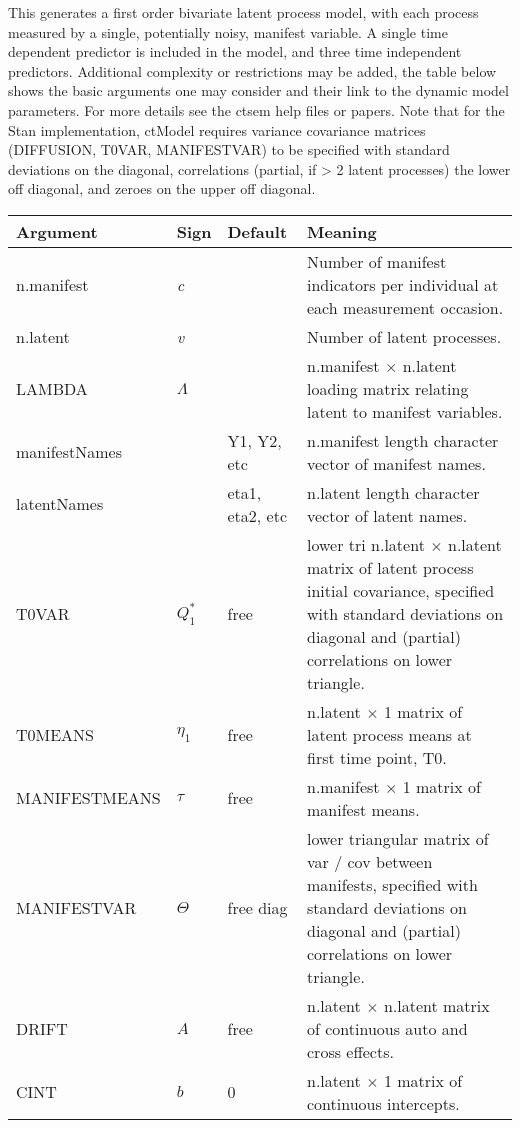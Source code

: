 \documentclass[nojss]{jss}\usepackage[]{graphicx}\usepackage[]{color}
\begin{document}
This generates a first order bivariate latent process model, with each process measured by a single, potentially noisy, manifest variable. A single time dependent predictor is included in the model, and three time independent predictors. Additional complexity or restrictions may be added, the table below shows the basic arguments one may consider and their link to the dynamic model parameters. For more details see the ctsem help files or papers. Note that for the Stan implementation, ctModel requires variance covariance matrices (DIFFUSION, T0VAR, MANIFESTVAR) to be specified with standard deviations on the diagonal, correlations (partial, if > 2 latent processes) the lower off diagonal, and zeroes on the upper off diagonal. 

\begin{table}\footnotesize
\begin{tabular}{l|l|l p{8cm} }
\textbf{Argument} & \textbf{Sign} & \textbf{Default} & \textbf{Meaning}\\
\hline
 n.manifest & \textit{c} & & Number of manifest indicators per individual at each measurement occasion.\\
 n.latent & \textit{v} & & Number of latent processes.\\
 LAMBDA & $\Lambda$& & n.manifest $\times$ n.latent loading matrix relating latent to manifest variables.\\
 manifestNames & & Y1, Y2, etc & n.manifest length character vector of manifest names.\\
 latentNames & & eta1, eta2, etc & n.latent length character vector of latent names.\\
 T0VAR & $Q^*_1$ & free & lower tri n.latent $\times$ n.latent matrix of latent process initial covariance, specified with standard deviations on diagonal and (partial) correlations on lower triangle.\\
 T0MEANS & $\eta_1$ & free & n.latent $\times$ 1 matrix of latent process means at first time point, T0.\\
 MANIFESTMEANS & $\tau$ & free & n.manifest $\times$ 1 matrix of manifest means.\\
 MANIFESTVAR & $\Theta$ & free diag & lower triangular matrix of var / cov between manifests, specified with standard deviations on diagonal and (partial) correlations on lower triangle.\\
 DRIFT & $A$ & free & n.latent $\times$ n.latent matrix of continuous auto and cross effects.\\
 CINT & $b$ & 0 & n.latent $\times$ 1 matrix of continuous intercepts.\\

\end{tabular}
\end{table}
\end{document}
